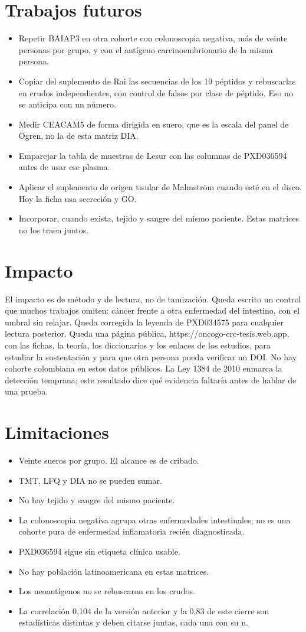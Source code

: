 \documentclass[12pt,oneside]{report}
\begin{document}
\section{Trabajos futuros}
\begin{itemize}
\item Repetir BAIAP3 en otra cohorte con colonoscopia negativa, más de veinte personas por grupo, y con el antígeno carcinoembrionario de la misma persona.
\item Copiar del suplemento de Rai las secuencias de los 19 péptidos y rebuscarlas en crudos independientes, con control de falsos por clase de péptido. Eso no se anticipa con un número.
\item Medir CEACAM5 de forma dirigida en suero, que es la escala del panel de Ögren, no la de esta matriz DIA.
\item Emparejar la tabla de muestras de Lesur con las columnas de PXD036594 antes de usar ese plasma.
\item Aplicar el suplemento de origen tisular de Malmström cuando esté en el disco. Hoy la ficha usa secreción y GO.
\item Incorporar, cuando exista, tejido y sangre del mismo paciente. Estas matrices no los traen juntos.
\end{itemize}
\section{Impacto}
El impacto es de método y de lectura, no de tamización. Queda escrito un control que muchos trabajos omiten: cáncer frente a otra enfermedad del intestino, con el umbral sin relajar. Queda corregida la leyenda de PXD034575 para cualquier lectura posterior. Queda una página pública, https://oncogo-crc-tesis.web.app, con las fichas, la teoría, los diccionarios y los enlaces de los estudios, para estudiar la sustentación y para que otra persona pueda verificar un DOI. No hay cohorte colombiana en estos datos públicos. La Ley 1384 de 2010 enmarca la detección temprana; este resultado dice qué evidencia faltaría antes de hablar de una prueba.

\section{Limitaciones}
\begin{itemize}
\item Veinte sueros por grupo. El alcance es de cribado.
\item TMT, LFQ y DIA no se pueden sumar.
\item No hay tejido y sangre del mismo paciente.
\item La colonoscopia negativa agrupa otras enfermedades intestinales; no es una cohorte pura de enfermedad inflamatoria recién diagnosticada.
\item PXD036594 sigue sin etiqueta clínica usable.
\item No hay población latinoamericana en estas matrices.
\item Los neoantígenos no se rebuscaron en los crudos.
\item La correlación 0,104 de la versión anterior y la 0,83 de este cierre son estadísticas distintas y deben citarse juntas, cada una con su n.
\end{itemize}
\end{document}
